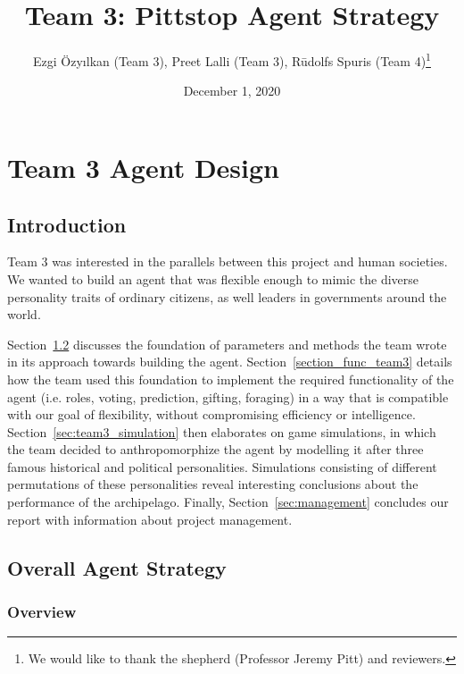 \chapter{Team 3 Agent Design}

\title{Team 3: Pittstop Agent Strategy}
\author{Ezgi Özyılkan (Team 3),  Preet Lalli (Team 3), Rūdolfs Spuris (Team 4)\footnote{We would like to thank the shepherd (Professor Jeremy Pitt) and reviewers.}}
\date{December 1, 2020}

\maketitle

\section{Introduction}

Team 3 was interested in the parallels between this project and human societies. We wanted to build an agent that was flexible enough to mimic the diverse personality traits of ordinary citizens, as well leaders in governments around the world.

Section~\ref{sec:overall_strat} discusses the foundation of parameters and methods the team wrote in its approach towards building the agent. Section~\ref{section_func_team3} details how the team used this foundation to implement the required functionality of the agent (i.e. roles, voting, prediction, gifting, foraging) in a way that is compatible with our goal of flexibility, without compromising efficiency or intelligence. Section~\ref{sec:team3_simulation} then elaborates on game simulations, in which the team decided to anthropomorphize the agent by modelling it after three famous historical and political personalities. Simulations consisting of different permutations of these personalities reveal interesting conclusions about the performance of the archipelago. Finally, Section~\ref{sec:management} concludes our report with information about project management.

\section{Overall Agent Strategy}
\label{sec:overall_strat}

\subsection{Overview}
\label{sec:overview}


